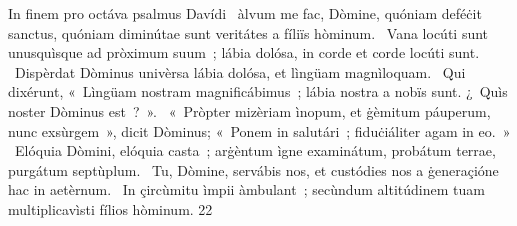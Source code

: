 { In finem pro octáva psalmus Davídi}
{%
~àlvum me fac, Dòmine, quóniam deféċit sanctus, quóniam diminútae sunt veritátes a fíliïs hòminum.
~Vana locúti sunt unusquìsque ad pròximum suum~; lábia dolósa, in corde et corde locúti sunt.
~Dispèrdat Dòminus univèrsa lábia dolósa, et lìngüam magnìloquam.
~Qui dixérunt, «~Lìngüam nostram magnificábimus~; lábia nostra a nobïs sunt. ¿~Quìs noster Dòminus est~?~».
~«~Pròpter mizèriam ìnopum, et ġèmitum páuperum, nunc exsùrgem~», dicit Dòminus; «~Ponem in salutári~; fiduċiáliter agam in eo.~»
~Elóquia Dòmini, elóquia casta~; arġèntum ìgne examinátum, probátum terrae, purgátum septùplum.
~Tu, Dòmine, servábis nos, et custódies nos a ġeneraçióne hac in aetèrnum.
~In çircùmitu ìmpii àmbulant~; secùndum altitúdinem tuam multiplicavìsti fílios hòminum.
}
{2}{2}
